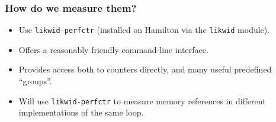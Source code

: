 \documentclass[dvipsnames,presentation,aspectratio=169,14pt]{beamer}
\begin{document}
\begin{frame}
  \frametitle{How do we measure them?}
  \begin{itemize}
  \item Use \texttt{likwid-perfctr} (installed on Hamilton via the
    \texttt{likwid} module).
  \item Offers a reasonably friendly command-line interface.
  \item Provides access both to counters directly, and many useful
    predefined ``groups''.
  \end{itemize}
  \begin{itemize}
  \item Will use \texttt{likwid-perfctr} to measure memory references
    in different implementations of the same loop.
  \end{itemize}

\end{frame}
\end{document}
